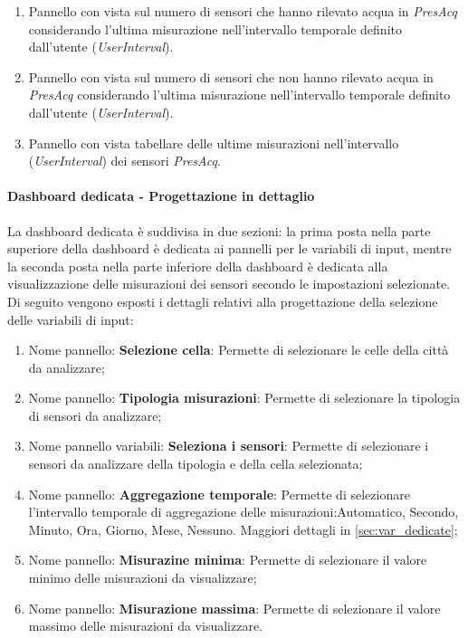 \begin{enumerate}
\begin{enumerate}
\item Pannello con vista sul numero di sensori che hanno rilevato acqua in \textit{PresAcq} considerando l'ultima misurazione nell'intervallo temporale definito dall'utente (\textit{UserInterval}).
\item Pannello con vista sul numero di sensori che non hanno rilevato acqua in \textit{PresAcq} considerando l'ultima misurazione nell'intervallo temporale definito dall'utente (\textit{UserInterval}).
\item Pannello con vista tabellare delle ultime misurazioni nell'intervallo (\textit{UserInterval}) dei sensori \textit{PresAcq}.
\end{enumerate}
\end{enumerate}


\paragraph*{Dashboard dedicata - Progettazione in dettaglio}
La dashboard dedicata è suddivisa in due sezioni: la prima posta nella parte superiore della dashboard è dedicata ai pannelli per le variabili di input, mentre la seconda posta nella parte inferiore della dashboard è dedicata alla visualizzazione delle misurazioni dei sensori secondo le impostazioni selezionate.\\
Di seguito vengono esposti i dettagli relativi alla progettazione della selezione delle variabili di input:
\begin{enumerate}
    \item Nome pannello: \textbf{Selezione cella}: Permette di selezionare le celle della città da analizzare;
    \item Nome pannello: \textbf{Tipologia misurazioni}: Permette di selezionare la tipologia di sensori da analizzare;
    \item Nome pannello variabili: \textbf{Seleziona i sensori}: Permette di selezionare i sensori da analizzare della tipologia e della cella selezionata;
    \item Nome pannello: \textbf{Aggregazione temporale}: Permette di selezionare l'intervallo temporale di aggregazione delle misurazioni:{Automatico, Secondo, Minuto, Ora, Giorno, Mese, Nessuno}. Maggiori dettagli in \ref{sec:var_dedicate};
    \item Nome pannello: \textbf{Misurazine minima}: Permette di selezionare il valore minimo delle misurazioni da visualizzare;
    \item Nome pannello: \textbf{Misurazione massima}: Permette di selezionare il valore massimo delle misurazioni da visualizzare.
\end{enumerate}

